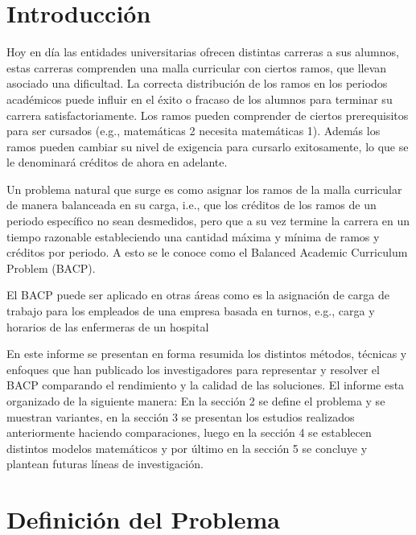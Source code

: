 \documentclass[letterpaper,10pt]{article}
\begin{document}
\section{Introducción}

Hoy en día las entidades universitarias ofrecen distintas carreras a sus alumnos, estas carreras comprenden una malla curricular con ciertos ramos, que llevan asociado una dificultad. La correcta distribución de los ramos en los periodos académicos puede influir en el éxito o fracaso de los alumnos para terminar su carrera satisfactoriamente.
Los ramos pueden comprender de ciertos prerequisitos para ser cursados (e.g., matemáticas 2 necesita matemáticas 1). Además los ramos pueden cambiar su nivel de exigencia para cursarlo exitosamente, lo que se le denominará créditos de ahora en adelante.

Un problema natural que surge es como asignar los ramos de la malla curricular de manera balanceada en su carga, i.e., que los créditos de los ramos de un periodo específico no sean desmedidos, pero que a su vez termine la carrera en un tiempo razonable estableciendo una cantidad máxima y mínima de ramos y créditos por periodo. A esto se le conoce como el Balanced Academic Curriculum Problem (BACP).

El BACP puede ser aplicado en otras áreas como es la asignación de carga de trabajo para los empleados de una empresa basada en turnos, e.g., carga y horarios de las enfermeras de un hospital~\cite{IOPORT.06373100}

En este informe se presentan en forma resumida los distintos métodos, técnicas y enfoques que han publicado los investigadores para representar y resolver el BACP comparando el rendimiento y la calidad de las soluciones. El informe esta organizado de la siguiente manera: En la sección 2 se define el problema y se muestran variantes, en la sección 3 se presentan los estudios realizados anteriormente haciendo comparaciones, luego en la sección 4 se establecen distintos modelos matemáticos y por último en la sección 5 se concluye y plantean futuras líneas de investigación.


\section{Definición del Problema}
\end{document}
